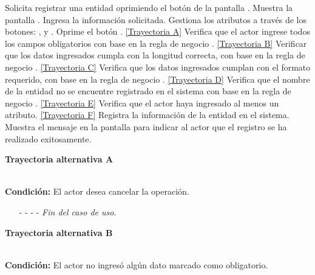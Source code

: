 	\begin{UCtrayectoria}
		\UCpaso[\UCactor] Solicita registrar una entidad oprimiendo el botón  de la pantalla .
		\UCpaso[\UCsist] Muestra la pantalla . \label{CU7.1-P2}
		\UCpaso[\UCactor] Ingresa la información solicitada. \label{CU7.1-P3}
		\UCpaso[\UCactor] Gestiona los atributos a través de los botones: , \editar y \eliminar. \label{CU7.1-P4}
		\UCpaso[\UCactor] Oprime el botón . \hyperlink{CU7-1:TAA}{[Trayectoria A]}
		\UCpaso[\UCsist] Verifica que el actor ingrese todos los campos obligatorios con base en la regla de negocio . \hyperlink{CU7-1:TAB}{[Trayectoria B]}
		\UCpaso[\UCsist] Verificar que los datos ingresados cumpla con la longitud correcta, con base en la regla de negocio . \hyperlink{CU7-1:TAC}{[Trayectoria C]}
		\UCpaso[\UCsist] Verifica que los datos ingresados cumplan con el formato requerido, con base en la regla de negocio . \hyperlink{CU7-1:TAD}{[Trayectoria D]}
		\UCpaso[\UCsist] Verifica que el nombre de la entidad no se encuentre registrado en el sistema con base en la regla de negocio . \hyperlink{CU7-1:TAE}{[Trayectoria E]}
		\UCpaso[\UCsist] Verifica que el actor haya ingresado al menos un atributo. \hyperlink{CU7-1:TAF}{[Trayectoria F]}
		\UCpaso[\UCsist] Registra la información de la entidad en el sistema.
		\UCpaso[\UCsist] Muestra el mensaje  en la pantalla  para indicar al actor que el registro se ha realizado exitosamente.
	\end{UCtrayectoria}		
\hypertarget{CU7-1:TAA}{\textbf{Trayectoria alternativa A}}\\
\noindent \textbf{Condición:} El actor desea cancelar la operación.
\begin{enumerate}
	\UCpaso[\UCactor] Solicita cancelar la operación oprimiendo el botón  de la pantalla 
	\UCpaso[\UCsist] Muestra la pantalla .
	\item[- -] - - {\em {Fin del caso de uso}}.%
\end{enumerate}
\hypertarget{CU7-1:TAB}{\textbf{Trayectoria alternativa B}}\\
\noindent \textbf{Condición:} El actor no ingresó algún dato marcado como obligatorio.
